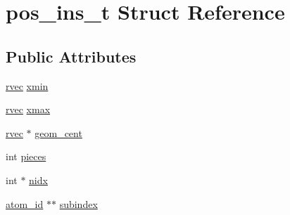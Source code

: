 \hypertarget{structpos__ins__t}{\section{pos\-\_\-ins\-\_\-t \-Struct \-Reference}
\label{structpos__ins__t}
}
\subsection*{\-Public \-Attributes}
\begin{DoxyCompactItemize}
\item 
\hyperlink{share_2template_2gromacs_2types_2simple_8h_aa02a552a4abd2f180c282a083dc3a999}{rvec} \hyperlink{structpos__ins__t_a07c346b4b6085b13812cae583f90998b}{xmin}
\item 
\hyperlink{share_2template_2gromacs_2types_2simple_8h_aa02a552a4abd2f180c282a083dc3a999}{rvec} \hyperlink{structpos__ins__t_a458537cc9551a13971464b671b2d1e86}{xmax}
\item 
\hyperlink{share_2template_2gromacs_2types_2simple_8h_aa02a552a4abd2f180c282a083dc3a999}{rvec} $\ast$ \hyperlink{structpos__ins__t_a7dc60d23a2a0ce5e776b969bd4a6a154}{geom\-\_\-cent}
\item 
int \hyperlink{structpos__ins__t_a55ff0e007a435c210df853b154f2dc39}{pieces}
\item 
int $\ast$ \hyperlink{structpos__ins__t_a86a94661b5b710fa85319f624d5e182e}{nidx}
\item 
\hyperlink{include_2types_2simple_8h_ad3f47cdb48677e516e2049719612c737}{atom\-\_\-id} $\ast$$\ast$ \hyperlink{structpos__ins__t_abc5522bdd757fdbe28cdf850138756ad}{subindex}
\end{DoxyCompactItemize}


